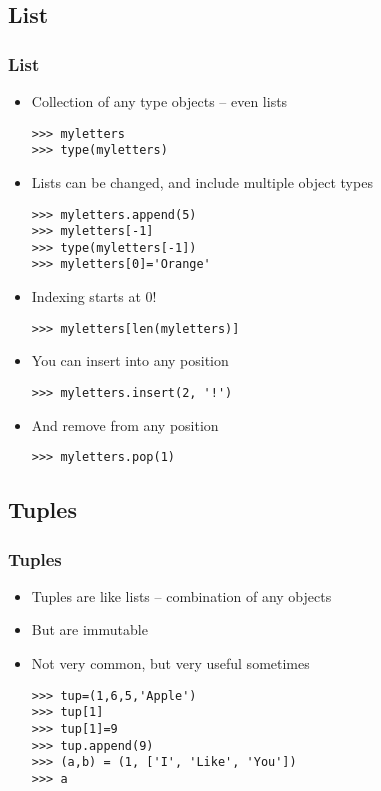 \documentclass[xcolor=x11names,compress]{beamer}
\renewcommand{\(}{\begin{columns}}
\renewcommand{\)}{\end{columns}}
\newcommand{\<}[1]{\begin{column}{#1}}
\renewcommand{\>}{\end{column}}
\begin{document}
\subsection{List}
\begin{frame}[fragile]
\footnotesize
\frametitle{List}
\begin{itemize}
\item Collection of any type objects -- even lists \pause
\begin{verbatim}
>>> myletters
>>> type(myletters)
\end{verbatim} \pause
\item Lists can be changed, and include multiple object types \pause
\begin{verbatim}
>>> myletters.append(5)
>>> myletters[-1]
>>> type(myletters[-1])
>>> myletters[0]='Orange'
\end{verbatim}
\pause
\item Indexing starts at 0! \pause
\begin{verbatim}
>>> myletters[len(myletters)]
\end{verbatim}
\pause
\item You can insert into any position
\begin{verbatim}
>>> myletters.insert(2, '!')
\end{verbatim}
\pause
\item And remove from any position \pause
\begin{verbatim}
>>> myletters.pop(1)
\end{verbatim}
\end{itemize}
\end{frame}

\subsection{Tuples}
\begin{frame}[fragile]
\frametitle{Tuples}
\begin{itemize}
\item Tuples are like lists -- combination of any objects \pause
\item But are immutable \pause
\item Not very common, but very useful sometimes \pause
\begin{verbatim}
>>> tup=(1,6,5,'Apple')
>>> tup[1]
>>> tup[1]=9
>>> tup.append(9)
>>> (a,b) = (1, ['I', 'Like', 'You'])
>>> a
\end{verbatim}
\end{itemize}
\end{frame}
\end{document}
